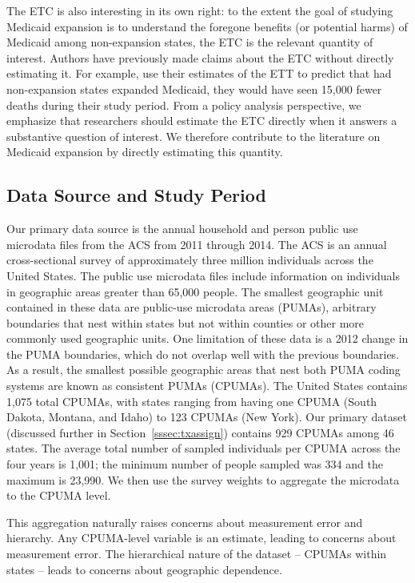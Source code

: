 \documentclass[aoas]{imsart}
\theoremstyle{plain}
\theoremstyle{remark}
\begin{document}
The ETC is also interesting in its own right: to the extent the goal of studying Medicaid expansion is to understand the foregone benefits (or potential harms) of Medicaid among non-expansion states, the ETC is the relevant quantity of interest. Authors have previously made claims about the ETC without directly estimating it. For example, \cite{miller2019medicaid} use their estimates of the ETT to predict that had non-expansion states expanded Medicaid, they would have seen 15,000 fewer deaths during their study period. From a policy analysis perspective, we emphasize that researchers should estimate the ETC directly when it answers a substantive question of interest. We therefore contribute to the literature on Medicaid expansion by directly estimating this quantity.

\subsection{Data Source and Study Period}\label{ssec:data}

Our primary data source is the annual household and person public use microdata files from the ACS from 2011 through 2014. The ACS is an annual cross-sectional survey of approximately three million individuals across the United States. The public use microdata files include information on individuals in geographic areas greater than 65,000 people. The smallest geographic unit contained in these data are public-use microdata areas (PUMAs), arbitrary boundaries that nest within states but not within counties or other more commonly used geographic units. One limitation of these data is a 2012 change in the PUMA boundaries, which do not overlap well with the previous boundaries. As a result, the smallest possible geographic areas that nest both PUMA coding systems are known as consistent PUMAs (CPUMAs). The United States contains 1,075 total CPUMAs, with states ranging from having one CPUMA (South Dakota, Montana, and Idaho) to 123 CPUMAs (New York). Our primary dataset (discussed further in Section~\ref{sssec:txassign}) contains 929 CPUMAs among 46 states. The average total number of sampled individuals per CPUMA across the four years is 1,001; the minimum number of people sampled was 334 and the maximum is 23,990. We then use the survey weights to aggregate the microdata to the CPUMA level.  

This aggregation naturally raises concerns about measurement error and hierarchy. Any CPUMA-level variable is an estimate, leading to concerns about measurement error. The hierarchical nature of the dataset -- CPUMAs within states -- leads to concerns about geographic dependence.
\end{document}
